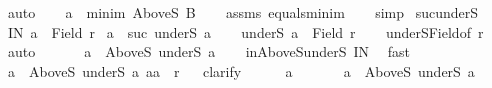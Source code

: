 \begin{isabellebody}
\ auto\isanewline
\ \ \isamarkupfalse%
\ {\isachardoublequoteopen}a\ {\isacharequal}{\kern0pt}\ minim\ {\isacharparenleft}{\kern0pt}AboveS\ B{\isacharparenright}{\kern0pt}{\isachardoublequoteclose}\isanewline
\ \ \isamarkupfalse%
\ assms\ equals{\isacharunderscore}{\kern0pt}minim\isanewline
\ \ \isamarkupfalse%
\ simp\isanewline
{}\isamarkupfalse%
%
\endisatagproof
{\isafoldproof}%
%
\isadelimproof
\isanewline
%
\endisadelimproof
\isanewline
{}\isamarkupfalse%
\ suc{\isacharunderscore}{\kern0pt}underS{\isacharcolon}{\kern0pt}\isanewline
{}\ IN{\isacharcolon}{\kern0pt}\ {\isachardoublequoteopen}a\ {\isasymin}\ Field\ r{\isachardoublequoteclose}\isanewline
{}\ {\isachardoublequoteopen}a\ {\isacharequal}{\kern0pt}\ suc\ {\isacharparenleft}{\kern0pt}underS\ a{\isacharparenright}{\kern0pt}{\isachardoublequoteclose}\isanewline
%
\isadelimproof
%
\endisadelimproof
%
\isatagproof
{}\isamarkupfalse%
{\isacharminus}{\kern0pt}\isanewline
\ \ \isamarkupfalse%
\ {\isachardoublequoteopen}underS\ a\ {\isasymle}\ Field\ r{\isachardoublequoteclose}\isanewline
\ \ \isamarkupfalse%
\ underS{\isacharunderscore}{\kern0pt}Field{\isacharbrackleft}{\kern0pt}of\ r{\isacharbrackright}{\kern0pt}\ \isamarkupfalse%
\ auto\isanewline
\ \ \isamarkupfalse%
\isanewline
\ \ \isamarkupfalse%
\ {\isachardoublequoteopen}a\ {\isasymin}\ AboveS\ {\isacharparenleft}{\kern0pt}underS\ a{\isacharparenright}{\kern0pt}{\isachardoublequoteclose}\isanewline
\ \ \isamarkupfalse%
\ in{\isacharunderscore}{\kern0pt}AboveS{\isacharunderscore}{\kern0pt}underS\ IN\ \isamarkupfalse%
\ fast\isanewline
\ \ \isamarkupfalse%
\isanewline
\ \ \isamarkupfalse%
\ {\isachardoublequoteopen}{\isasymforall}a{\isacharprime}{\kern0pt}\ {\isasymin}\ AboveS\ {\isacharparenleft}{\kern0pt}underS\ a{\isacharparenright}{\kern0pt}{\isachardot}{\kern0pt}\ {\isacharparenleft}{\kern0pt}a{\isacharcomma}{\kern0pt}a{\isacharprime}{\kern0pt}{\isacharparenright}{\kern0pt}\ {\isasymin}\ r{\isachardoublequoteclose}\isanewline
\ \ \isamarkupfalse%
{\isacharparenleft}{\kern0pt}clarify{\isacharparenright}{\kern0pt}\isanewline
\ \ \ \ \isamarkupfalse%
\ a{\isacharprime}{\kern0pt}\isanewline
\ \ \ \ \isamarkupfalse%
\ {\isacharasterisk}{\kern0pt}{\isacharcolon}{\kern0pt}\ {\isachardoublequoteopen}a{\isacharprime}{\kern0pt}\ {\isasymin}\ AboveS\ {\isacharparenleft}{\kern0pt}underS\ a{\isacharparenright}{\kern0pt}{\isachardoublequoteclose}\isanewline

\end{isabellebody}
